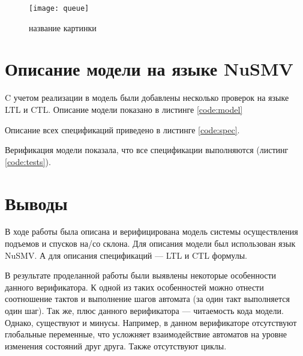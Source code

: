 \begin{figure}[H]
	\begin{center}
		\texttt{[image: queue]}
		\caption{название картинки} 
		\label{pic:queue} %
	\end{center}
\end{figure}

\section{Описание модели на языке NuSMV}
C учетом реализации в модель были добавлены несколько проверок на языке LTL и CTL. Описание модели показано в листинге \ref{code:model}


\parindent=1cm


Описание всех спецификаций приведено в листинге \ref{code:spec}.



\parindent=1cm

Верификация модели показала, что все спецификации выполняются (листинг \ref{code:tests}).


\parindent=1cm

\newpage
\section{Выводы}
В ходе работы была описана и верифицирована модель системы осуществления подъемов и спусков на/со склона. Для описания модели был использован язык NuSMV. А для описания спецификаций --- LTL и CTL формулы.

В результате проделанной работы были выявлены некоторые особенности данного верификатора. К одной из таких особенностей можно отнести соотношение тактов и выполнение шагов автомата (за один такт выполняется один шаг). Так же, плюс данного верификатора --- читаемость кода модели. Однако, существуют и минусы. Например, в данном верификаторе отсутствуют глобальные переменные, что усложняет взаимодействие автоматов на уровне изменения состояний друг друга. Также отсутствуют циклы.


